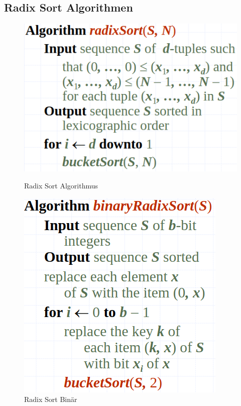 \subsection{Radix Sort Algorithmen}
\begin{figure}[h!]
	\centering
	\begin{minipage}[t]{0.4\textwidth}
		\centering
		\includegraphics[width=0.7\linewidth]{images/radixsortalg}
		\caption{Radix Sort Algorithmus}
		\label{fig:radixsortalg}
	\end{minipage}
	\begin{minipage}[t]{0.4\textwidth}
		\centering
		\includegraphics[width=0.7\linewidth]{images/radixsortbinaryalg}
		\caption{Radix Sort Binär}
		\label{fig:radixsortbinary}
	\end{minipage}
\end{figure}
\clearpage

